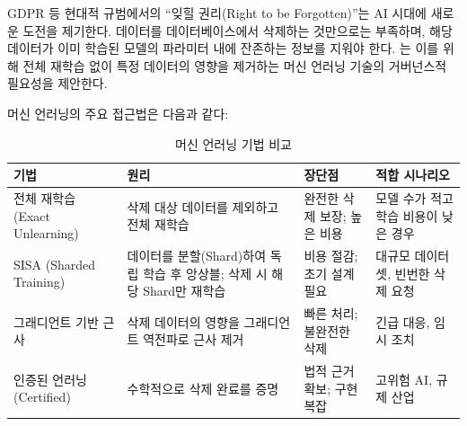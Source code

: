 GDPR 등 현대적 규범에서의 ``잊힐 권리(Right to be Forgotten)''는 AI 시대에 새로운 도전을 제기한다. 데이터를 데이터베이스에서 삭제하는 것만으로는 부족하며, 해당 데이터가 이미 학습된 모델의 파라미터 내에 잔존하는 정보를 지워야 한다. \cite{cao2015towards}는 이를 위해 전체 재학습 없이 특정 데이터의 영향을 제거하는 머신 언러닝 기술의 거버넌스적 필요성을 제안한다.

머신 언러닝의 주요 접근법은 다음과 같다:

\begin{table}[htbp]
\centering
\caption{머신 언러닝 기법 비교}
\label{tab:unlearning_methods}
\begin{tabularx}{\textwidth}{p{2.5cm}XXp{2.5cm}}
\toprule
\textbf{기법} & \textbf{원리} & \textbf{장단점} & \textbf{적합 시나리오} \\
\midrule
전체 재학습 (Exact Unlearning) & 삭제 대상 데이터를 제외하고 전체 재학습 & 완전한 삭제 보장; 높은 비용 & 모델 수가 적고 학습 비용이 낮은 경우 \\
\midrule
SISA (Sharded Training) & 데이터를 분할(Shard)하여 독립 학습 후 앙상블; 삭제 시 해당 Shard만 재학습 & 비용 절감; 초기 설계 필요 & 대규모 데이터셋, 빈번한 삭제 요청 \\
\midrule
그래디언트 기반 근사 & 삭제 데이터의 영향을 그래디언트 역전파로 근사 제거 & 빠른 처리; 불완전한 삭제 & 긴급 대응, 임시 조치 \\
\midrule
인증된 언러닝 (Certified) & 수학적으로 삭제 완료를 증명 & 법적 근거 확보; 구현 복잡 & 고위험 AI, 규제 산업 \\
\bottomrule
\end{tabularx}
\end{table}

